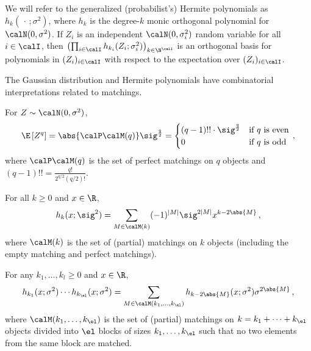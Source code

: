 \documentclass[12pt]{article}
\begin{document}
We will refer to the generalized (probabilist's) Hermite polynomials as $h_k(\,\cdot\,; \sigma^2)$, where $h_k$ is the degree-$k$ monic orthogonal polynomial for $\calN(0, \sigma^2)$. If $Z_i$ is an independent $\calN(0, \sigma_i^2)$ random variable for all $i\in\calI$, then
$\left(\prod_{i \in \calI} h_{k_i}(Z_i;\sigma_i^2)\right)_{k\in\N^\calI}$ is an orthogonal basis for polynomials in $(Z_i)_{i\in\calI}$ with respect to the expectation over $(Z_i)_{i\in\calI}$.

The Gaussian distribution and Hermite polynomials have combinatorial interpretations related to matchings.

\begin{lemma}
    \label{lem:gaussian-moments}
    For $Z \sim \calN(0, \sigma^2)$, 
    \[
        \E\left[Z^{q}\right] = \abs{\calP\calM(q)}\sig^{\frac q 2} = \begin{cases}
        (q-1)!!\cdot \sig^{\frac q 2} & \text{if $q$ is even}\\
        0 & \text{if $q$ is odd}
    \end{cases}\,,
    \]
    where $\calP\calM(q)$ is the set of perfect matchings on $q$ objects and $(q-1)!!=\frac {q!} {2^{q/2} (q/2)!}$.
\end{lemma}

\begin{lemma}
\label{fact:hermite-matchings}
    For all $k\ge 0$ and $x\in\R$,
    \[
        h_k(x; \sig^2) = \sum_{M \in \calM(k)} (-1)^{|M|} \sig^{2|M|} x^{k-2\abs{M}}\,,
    \]
    where $\calM(k)$ is the set of (partial) matchings on $k$ objects (including the empty matching and perfect matchings).
\end{lemma}

\begin{lemma}\label{fact:hermite-product}
    For any $k_1,\ldots,k_l\ge 0$ and $x\in\R$,
        \begin{align*}
        h_{k_1}(x; \sigma^2)\cdots h_{k_\el}(x; \sigma^2) = \sum_{M \in \calM(k_1,\dots, k_\el)} h_{k - 2\abs{M}}(x; \sigma^2) \sigma^{2\abs{M}}\,,
        \end{align*}
        where $\calM(k_1, \dots, k_\el)$ is the set of (partial)
        matchings on $k=k_1 + \cdots + k_\el$ objects divided into $\el$ blocks of sizes $k_1,\ldots,k_\el$
        such that no two elements from the same block are matched.
\end{lemma}
\end{document}
